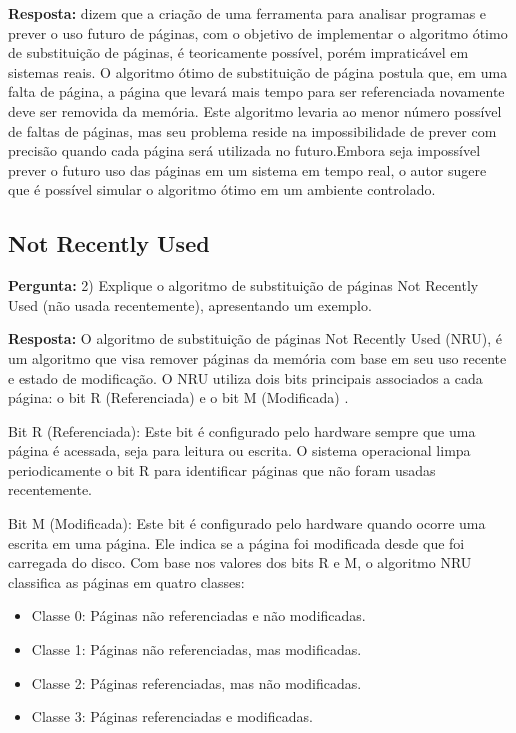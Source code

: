 \documentclass{article}
\begin{document}
\textbf{Resposta:}  \textcite[p. 144]{tanenbaum2021} dizem que a criação de uma ferramenta para analisar programas e prever o uso futuro de páginas, com o objetivo de implementar o algoritmo ótimo de substituição de páginas, é teoricamente possível, porém impraticável em sistemas reais. O algoritmo ótimo de substituição de página postula que, em uma falta de página, a página que levará mais tempo para ser referenciada novamente deve ser removida da memória. Este algoritmo levaria ao menor número possível de faltas de páginas, mas seu problema reside na impossibilidade de prever com precisão quando cada página será utilizada no futuro.Embora seja impossível prever o futuro uso das páginas em um sistema em tempo real, o autor sugere que é possível simular o algoritmo ótimo em um ambiente controlado.

\subsection{Not Recently Used}

\textbf{Pergunta:} 2) Explique o algoritmo de substituição de páginas Not Recently Used (não usada recentemente), apresentando um exemplo. \newline

\textbf{Resposta:}  O algoritmo de substituição de páginas Not Recently Used (NRU), é um algoritmo que visa remover páginas da memória com base em seu uso recente e estado de modificação. O NRU utiliza dois bits principais associados a cada página: o bit R (Referenciada) e o bit M (Modificada) \parencite[p. 145]{tanenbaum2021}.

Bit R (Referenciada): Este bit é configurado pelo hardware sempre que uma página é acessada, seja para leitura ou escrita. O sistema operacional limpa periodicamente o bit R para identificar páginas que não foram usadas recentemente.

Bit M (Modificada): Este bit é configurado pelo hardware quando ocorre uma escrita em uma página. Ele indica se a página foi modificada desde que foi carregada do disco. Com base nos valores dos bits R e M, o algoritmo NRU classifica as páginas em quatro classes:

\begin{itemize}
    
    \item Classe 0: Páginas não referenciadas e não modificadas.
    \item Classe 1: Páginas não referenciadas, mas modificadas.
    \item Classe 2: Páginas referenciadas, mas não modificadas.
    \item Classe 3: Páginas referenciadas e modificadas.
\end{itemize}
\end{document}
